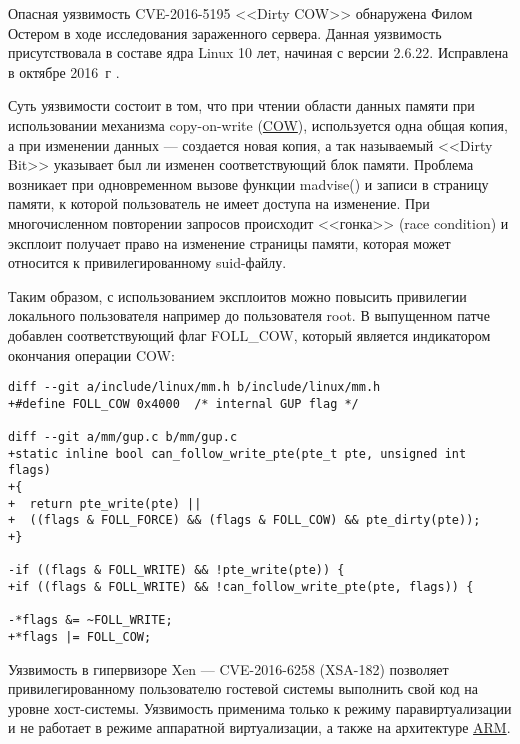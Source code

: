 Опасная уязвимость CVE-2016-5195 <<Dirty COW>> обнаружена Филом Остером в ходе исследования зараженного сервера.
Данная уязвимость присутствовала в составе ядра Linux 10 лет, начиная с версии 2.6.22.
Исправлена в октябре 2016~г \cite{dcow}.

Суть уязвимости состоит в том, что при чтении области данных памяти при использовании механизма copy-on-write (\hyperlink{cow}{COW}), используется одна общая копия, а при изменении данных --- создается новая копия, а так называемый <<Dirty Bit>> указывает был ли изменен соответствующий блок памяти.
Проблема возникает при одновременном вызове функции madvise() и записи в страницу памяти, к которой пользователь не имеет доступа на изменение.
При многочисленном повторении запросов происходит <<гонка>> (race condition) и эксплоит получает право на изменение страницы памяти, которая может относится к привилегированному suid-файлу.

Таким образом, с использованием эксплоитов можно повысить привилегии локального пользователя например до пользователя root.
В выпущенном патче добавлен соответствующий флаг FOLL\_COW, который является индикатором окончания операции COW:
\begin{lstlisting}
diff --git a/include/linux/mm.h b/include/linux/mm.h
+#define FOLL_COW 0x4000  /* internal GUP flag */

diff --git a/mm/gup.c b/mm/gup.c
+static inline bool can_follow_write_pte(pte_t pte, unsigned int flags)
+{
+  return pte_write(pte) ||
+  ((flags & FOLL_FORCE) && (flags & FOLL_COW) && pte_dirty(pte));
+}

-if ((flags & FOLL_WRITE) && !pte_write(pte)) {
+if ((flags & FOLL_WRITE) && !can_follow_write_pte(pte, flags)) {

-*flags &= ~FOLL_WRITE;
+*flags |= FOLL_COW;
\end{lstlisting}

Уязвимость в гипервизоре Xen --- CVE-2016-6258 (XSA-182) позволяет привилегированному пользователю гостевой системы выполнить свой код на уровне хост-системы.
Уязвимость применима только к режиму паравиртуализации и не работает в режиме аппаратной виртуализации, а также на архитектуре \hyperlink{arm}{ARM}.

